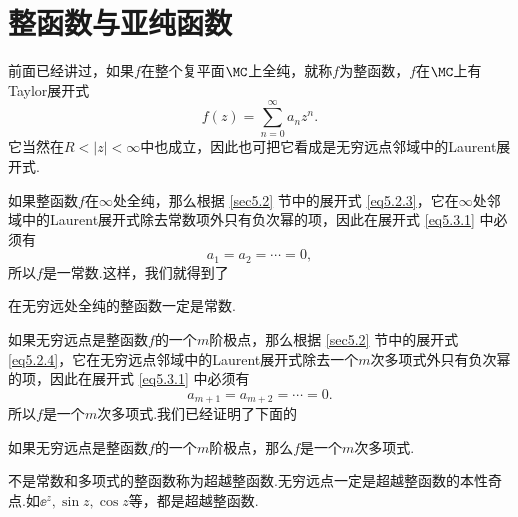 \section{整函数与亚纯函数\label{sec5.3}}
前面已经讲过，如果$f$在整个复平面$\MC$上全纯，就称$f$为整函数，$f$在$\MC$上有Taylor展开式
\begin{equation}\label{eq5.3.1}
f(z)=\sum_{n=0}^\infty a_nz^n.
\end{equation}
它当然在$R<|z|<\infty$中也成立，因此也可把它看成是无穷远点邻域中的Laurent展开式.

如果整函数$f$在$\infty$处全纯，那么根据 \ref{sec5.2} 节中的展开式 \eqref{eq5.2.3}，它在$\infty$处邻域中的Laurent展开式除去常数项外只有负次幂的项，因此在展开式 \eqref{eq5.3.1} 中必须有
\[a_1=a_2=\cdots=0,\]
所以$f$是一常数.这样，我们就得到了
\begin{theorem}\label{thm5.3.1}
在无穷远处全纯的整函数一定是常数.
\end{theorem}

如果无穷远点是整函数$f$的一个$m$阶极点，那么根据 \ref{sec5.2} 节中的展开式 \eqref{eq5.2.4}，它在无穷远点邻域中的Laurent展开式除去一个$m$次多项式外只有负次幂的项，因此在展开式 \eqref{eq5.3.1} 中必须有
\[a_{m+1}=a_{m+2}=\cdots=0.\]
所以$f$是一个$m$次多项式.我们已经证明了下面的
\begin{theorem}\label{thm5.3.2}
如果无穷远点是整函数$f$的一个$m$阶极点，那么$f$是一个$m$次多项式.
\end{theorem}

不是常数和多项式的整函数称为超越整函数.无穷远点一定是超越整函数的本性奇点.如$\ee^z,\sin z,\cos z$等，都是超越整函数.

